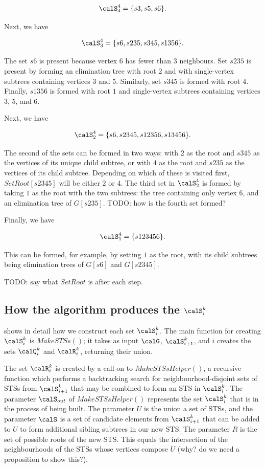 \[
\calS_4^4 = \{s3, s5, s6\}.
\]

Next, we have

\[
\calS_3^4 = \{s6, s235, s345, s1356\}.
\]

The set $s6$ is present because vertex 6 has fewer than 3 neighbours.  Set $s235$
is present by forming an elimination tree with root $2$ and with single-vertex subtrees
containing vertices 3 and 5.  Similarly, set $s345$ is formed with root $4$.
Finally, $s1356$ is formed with root $1$ and single-vertex subtrees containing vertices
3, 5, and 6.

Next, we have

\[
\calS_2^4 = \{s6, s2345, s12356, s13456\}.
\]

The second of the sets can be formed in two ways: with $2$ as the root and $s345$
as the vertices of its unique child subtree, or with $4$ as the root and $s235$
as the vertices of its child subtree.  Depending on which of these is visited first,
$\mathit{SetRoot}[s2345]$ will be either $2$ or $4$.  The third set in
$\calS_2^4$ is formed by taking $1$ as the root with the two subtrees:
the tree containing only vertex 6, and an elimination tree of $G[s235]$.
TODO: how is the fourth set formed?

Finally, we have

\[
\calS_1^4 = \{s123456\}.
\]

This can be formed, for example, by setting $1$ as the root, with its child subtrees
being elimination trees of $G[s6]$ and $G[s2345]$.

TODO: say what $\mathit{SetRoot}$ is after each step.

\subsection{How the algorithm produces the $\calS_i^k$}\label{subsec:HowToProduce}

 shows in detail how we construct each set $\calS_i^k$.
The main function for creating $\calS_i^k$ is $MakeSTSs()$;
it takes as input $\calG$, $\calS_{i+1}^k$, and $i$
creates the sets $\calQ_i^k$ and $\calR_i^k$, returning their union.

The set $\calR_i^k$ is created by a call on  to
$MakeSTSsHelper()$, a recursive function which performs a backtracking search
for neighbourhood-disjoint sets of STSs from $\calS_{i+1}^k$ that may be
combined to form an STS in $\calS_i^k$.
The parameter $\calS_{out}$ of
$MakeSTSsHelper()$ represents the set $\calS_i^k$ that is in the process
of being built.
The parameter $U$ is the union a set of STSs, and the parameter
$\calS$ is a set of candidate elements from $\calS_{i+1}^k$ that
can be added to $U$ to form additional sibling subtrees in our new STS.
The parameter $R$ is the set of possible roots of the new STS.
This equals the intersection of the neighbourhoods of the STSs
whose vertices compose $U$ (why? do we need a proposition to show this?).


